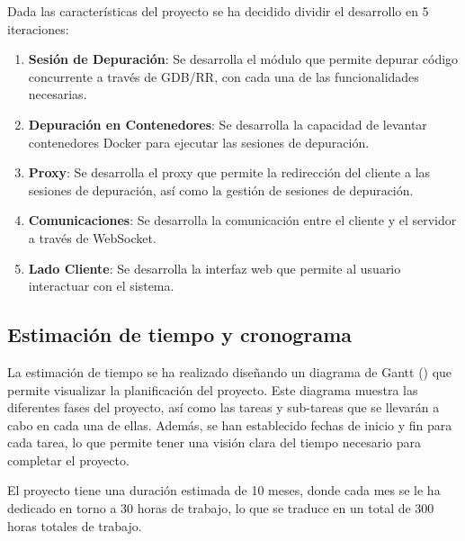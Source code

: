 Dada las características del proyecto se ha decidido dividir el desarrollo en 5 iteraciones:
\begin{enumerate}
    \item \textbf{Sesión de Depuración}: Se desarrolla el módulo que permite depurar código concurrente a través de GDB/RR, con cada una de las funcionalidades necesarias. 
    \item \textbf{Depuración en Contenedores}: Se desarrolla la capacidad de levantar contenedores Docker para ejecutar las sesiones de depuración.
    \item \textbf{Proxy}: Se desarrolla el proxy que permite la redirección del cliente a las sesiones de depuración, así como la gestión de sesiones de depuración.
    \item \textbf{Comunicaciones}: Se desarrolla la comunicación entre el cliente y el servidor a través de WebSocket.
    \item \textbf{Lado Cliente}: Se desarrolla la interfaz web que permite al usuario interactuar con el sistema.
\end{enumerate} 

\subsection{Estimación de tiempo y cronograma}\label{sec:cronograma}
La estimación de tiempo se ha realizado diseñando un diagrama de Gantt () que permite visualizar la planificación del proyecto. Este diagrama muestra las diferentes fases del proyecto, así como las tareas y sub-tareas que se llevarán a cabo en cada una de ellas. Además, se han establecido fechas de inicio y fin para cada tarea, lo que permite tener una visión clara del tiempo necesario para completar el proyecto.

El proyecto tiene una duración estimada de 10 meses, donde cada mes se le ha dedicado en torno a 30 horas de trabajo, lo que se traduce en un total de 300 horas totales de trabajo. 

